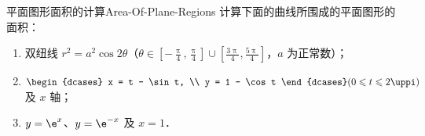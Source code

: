\begin{problem}{平面图形面积的计算}{Area-Of-Plane-Regions}
    计算下面的曲线所围成的平面图形的面积：
    \begin{enumerate}
        \item 双纽线 $r^2 = a^2 \cos 2\theta$（$\theta \in \left[-\frac{\uppi}{4}, \frac{\uppi}{4}\right] \cup \left[\frac{3\uppi}{4}, \frac{5\uppi}{4}\right]$，$a$ 为正常数）；
        \item $\begin{dcases} x = t - \sin t, \\ y = 1 - \cos t \end{dcases} (0 \leqslant t \leqslant 2\uppi)$ 及 $x$ 轴；
        \item $y = \e^x$、$y = \e^{-x}$ 及 $x = 1$．
    \end{enumerate}
\end{problem}

